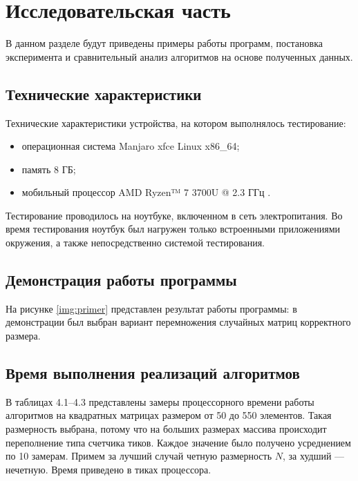 \chapter{Исследовательская часть}

В данном разделе будут приведены примеры работы программ, постановка эксперимента и сравнительный анализ алгоритмов на основе полученных данных.

\section{Технические характеристики}

Технические характеристики устройства, на котором выполнялось тестирование:

\begin{itemize}
	\item операционная система Manjaro xfce \cite{ubuntu} Linux \cite{linux} x86\_64;
	\item память 8 ГБ;
	\item мобильный процессор AMD Ryzen™ 7 3700U @ 2.3 ГГц \cite{intel}.
\end{itemize}

Тестирование проводилось на ноутбуке, включенном в сеть электропитания. Во время тестирования ноутбук был нагружен только встроенными приложениями окружения, а также непосредственно системой тестирования.

\section{Демонстрация работы программы}

На рисунке \ref{img:primer} представлен результат работы программы: в демонстрации был выбран вариант перемножения случайных матриц корректного размера.


\FloatBarrier

\section{Время выполнения реализаций алгоритмов}

В таблицах 4.1--4.3 представлены замеры процессорного времени работы алгоритмов на квадратных матрицах размером от 50 до 550 элементов. Такая размерность выбрана, потому что на больших размерах массива происходит переполнение типа счетчика тиков. Каждое значение было получено усреднением по 10 замерам. Примем за лучший случай четную размерность $N$, за худший --- нечетную. Время приведено в тиках процессора.


